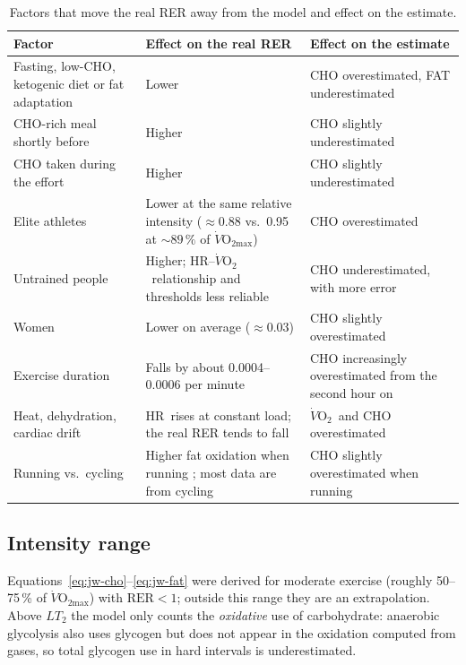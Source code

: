 \documentclass[10pt,a4paper]{article}
\newcommand{\VO}{\ensuremath{\dot V\mathrm{O_2}}}
\newcommand{\VOmax}{\ensuremath{\dot V\mathrm{O_{2max}}}}
\newcommand{\RER}{\ensuremath{\mathrm{RER}}}
\newcommand{\FC}{\ensuremath{\mathrm{HR}}}
\begin{document}
\begin{table}[htbp]
\centering
\caption{Factors that move the real RER away from the model and effect on the estimate.}
\label{tab:factors}
\small
\begin{tabularx}{\textwidth}{@{}>{\raggedright\arraybackslash}p{3.6cm} L >{\raggedright\arraybackslash}p{3.4cm}@{}}
\toprule
Factor & Effect on the real RER & Effect on the estimate \\
\midrule
Fasting, low-CHO, ketogenic diet or fat adaptation &
Lower \citep{bergman1999,achten2003cho} & CHO overestimated, FAT underestimated \\
CHO-rich meal shortly before & Higher & CHO slightly underestimated \\
CHO taken during the effort & Higher & CHO slightly underestimated \\
Elite athletes & Lower at the same relative intensity ($\approx0.88$
vs.\ 0.95 at $\sim89\,\%$ of \VOmax) \citep{hetlelid2015} & CHO overestimated \\
Untrained people & Higher; \FC--\VO\ relationship and thresholds less reliable &
CHO underestimated, with more error \\
Women & Lower on average ($\approx0.03$)
\citep{rothschild2022,venables2005} & CHO slightly overestimated \\
Exercise duration & Falls by about 0.0004--0.0006 per minute \citep{rothschild2022} &
CHO increasingly overestimated from the second hour on \\
Heat, dehydration, cardiac drift & \FC\ rises at constant load; the real RER tends to
fall & \VO\ and CHO overestimated \\
Running vs.\ cycling & Higher fat oxidation when running \citep{achten2003run}; most
data are from cycling & CHO slightly overestimated when running \\
\bottomrule
\end{tabularx}
\end{table}

\subsection{Intensity range}
Equations~\eqref{eq:jw-cho}--\eqref{eq:jw-fat} were derived for moderate exercise (roughly
50--75\,\% of \VOmax) with $\RER<1$; outside this range they are an extrapolation. Above
$LT_2$ the model only counts the \emph{oxidative} use of carbohydrate: anaerobic glycolysis
also uses glycogen but does not appear in the oxidation computed from gases, so total
glycogen use in hard intervals is underestimated.
\end{document}
